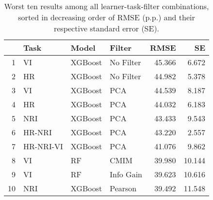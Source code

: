 \begin{table}[ht!]
\centering
\caption{Worst ten results among all learner-task-filter combinations, sorted in decreasing order of RMSE (p.p.) and their respective standard error (SE).} 
\label{tab:perf-worst-10}
\begin{tabular}{rlllrr}
  \hline
 & Task & Model & Filter & RMSE & SE \\ 
  \hline
1 & VI & XGBoost & No Filter & 45.366 & 6.672 \\ 
  2 & HR & XGBoost & No Filter & 44.982 & 5.378 \\ 
  3 & VI & XGBoost & PCA & 44.539 & 8.187 \\ 
  4 & HR & XGBoost & PCA & 44.032 & 6.183 \\ 
  5 & NRI & XGBoost & PCA & 43.433 & 9.543 \\ 
  6 & HR-NRI & XGBoost & PCA & 43.220 & 2.557 \\ 
  7 & HR-NRI-VI & XGBoost & PCA & 41.076 & 9.862 \\ 
  8 & VI & RF & CMIM & 39.980 & 10.144 \\ 
  9 & VI & RF & Info Gain & 39.623 & 10.616 \\ 
  10 & NRI & XGBoost & Pearson & 39.492 & 11.548 \\ 
   \hline
\end{tabular}
\end{table}
